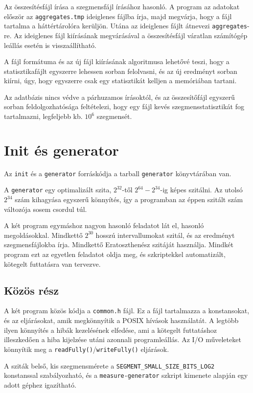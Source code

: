 Az összesítésfájl írása a szegmensfájl írásához hasonló.
A program az adatokat először az \texttt{aggregates.tmp} ideiglenes fájlba írja, majd megvárja, hogy a fájl tartalma a háttértárolóra kerüljön.
Utána az ideiglenes fájlt átnevezi \texttt{aggregates}-re.
Az ideiglenes fájl kiírásának megvárásával a összesítésfájl váratlan számítógép leállás esetén is visszaállítható.

A fájl formátuma és az új fájl kiírásának algoritmusa lehetővé teszi, hogy a statisztikafájlt egyszerre lehessen sorban felolvasni, és az új eredményt sorban kiírni, úgy, hogy egyszerre csak egy statisztikát kelljen a memóriában tartani.

Az adatbázis nincs védve a párhuzamos írásoktól, és az összesítőfájl egyszerű sorban feldolgozhatósága feltételezi, hogy egy fájl kevés szegmensstatisztikát fog tartalmazni, legfeljebb kb. $10^6$ szegmensét.

\section{Init és generator}

Az \texttt{init} és a \texttt{generator} forráskódja a tarball \texttt{generator} könyvtárában van.

A \texttt{generator} egy optimalizált szita, $2^{32}$-től $2^{64}-2^{34}$-ig képes szitálni.
Az utolsó $2^{34}$ szám kihagyása egyszerű könnyítés, így a programban az éppen szitált szám változója sosem csordul túl.

A két program egymáshoz nagyon hasonló feladatot lát el, hasonló megoldásokkal.
Mindkettő $2^{30}$ hosszú intervallumokat szitál, és az eredményt szegmensfájlokba írja.
Mindkettő Eratoszthenész szitáját használja.
Mindkét program ezt az egyetlen feladatot oldja meg, és szkriptekkel automatizált, kötegelt futtatásra van tervezve.

\subsection{Közös rész}

A két program közös kódja a \texttt{common.h} fájl.
Ez a fájl tartalmazza a konstansokat, és az eljárásokat, amik megkönnyítik a POSIX hívások használatát.
A legtöbb ilyen könnyítés a hibák kezelésének elfedése, ami a kötegelt futtatáshoz illeszkedően
a hiba kijelzése utáni azonnali programleállás.
Az I/O műveleteket könnyítik meg a \texttt{readFully()}/\texttt{writeFully()} eljárások.

A sziták belső, kis szegmensmérete a \texttt{SEGMENT\_SMALL\_SIZE\_BITS\_LOG2} konstanssal szabályozható, és a \texttt{measure-generator} szkript kimenete alapján egy adott géphez igazítható.

